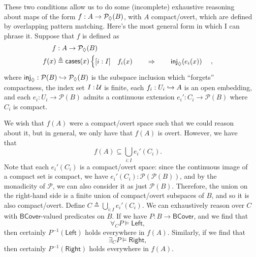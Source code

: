 These two conditions allow us to do some (incomplete) exhaustive reasoning about maps of the form $f : A \to \mathcal{P}_\lozenge(B)$, with $A$ compact/overt, which are defined by overlapping pattern matching. Here's the most general form in which I can phrase it. Suppose that $f$ is defined as
\begin{align*}
f &: A \to \mathcal{P}_\lozenge(B)
\\
f(x) &\triangleq \mathsf{cases}(x)
\begin{cases}
[i : I] \quad f_i(x) \qquad \Rightarrow \qquad \mathsf{inj}_{\lozenge}(e_i(x))
\end{cases},
\end{align*}
where $\mathsf{inj}_\lozenge : \mathcal{P}(B) \hookrightarrow \mathcal{P}_\lozenge(B)$ is the subspace inclusion which ``forgets'' compactness, the index set $I : \mathcal{U}$ is finite, each $f_i : U_i \hookrightarrow A$ is an open embedding, and each $e_i : U_i \to \mathcal{P}(B)$ admits a continuous extension $e_i' : C_i \to \mathcal{P}(B)$ where $C_i$ is compact.

We wish that $f(A)$ were a compact/overt space such that we could reason about it, but in general, we only have that $f(A)$ is overt. However, we have that
\[
f(A) \subseteq \bigcup_{i : I} e_i'(C_i).
\]
Note that each $e_i'(C_i)$ is a compact/overt space: since the continuous image of a compact set is compact, we have $e_i'(C_i) : \mathcal{P}(\mathcal{P}(B))$, and by the monadicity of $\mathcal{P}$, we can also consider it as just $\mathcal{P}(B)$. Therefore, the union on the right-hand side is a finite union of compact/overt subspaces of $B$, and so it is also compact/overt. Define $C \triangleq \bigcup_{i : I} e_i'(C_i)$. We can exhaustively reason over $C$ with $\mathsf{BCover}$-valued predicates on $B$. If we have $P : B \to \mathsf{BCover}$, and we find that
\[
\forall_C P \models \mathsf{Left},
\]
then certainly $P^{-1}(\mathsf{Left})$ holds everywhere in $f(A)$. Similarly, if we find that
\[
\exists_C P \models \mathsf{Right},
\]
then certainly $P^{-1}(\mathsf{Right})$ holds everywhere in $f(A)$.